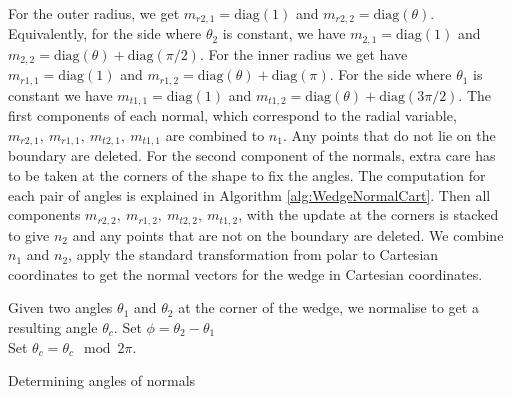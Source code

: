 For the outer radius, we get $m_{r2,1} = \text{diag}(1)$ and $m_{r2,2} = \text{diag} (\theta)$. Equivalently, for the side where $\theta_2$ is constant, we have $m_{2,1} = \text{diag}(1)$ and $m_{2,2} = \text{diag} (\theta) + \text{diag} (\pi/2)$. For the inner radius we get have $m_{r1,1} = \text{diag}(1)$ and $m_{r1,2} = \text{diag} (\theta) + \text{diag} (\pi)$. For the side where $\theta_1$ is constant we have $m_{t1,1} = \text{diag}(1)$ and $m_{t1,2} = \text{diag} (\theta) + \text{diag} (3\pi/2)$.
The first components of each normal, which correspond to the radial variable, $m_{r2,1}, \ m_{r1,1}, \ m_{t2,1}, \ m_{t1,1}$ are combined to $n_1$. Any points that do not lie on the boundary are deleted. 
For the second component of the normals, extra care has to be taken at the corners of the shape to fix the angles. The computation for each pair of angles is explained in Algorithm \ref{alg:WedgeNormalCart}.
Then all components $m_{r2,2}, \ m_{r1,2}, \ m_{t2,2}, \ m_{t1,2}$, with the update at the corners is stacked to give $n_2$ and any points that are not on the boundary are deleted.
We combine $n_1$ and $n_2$, apply the standard transformation from polar to Cartesian coordinates to get the normal vectors for the wedge in Cartesian coordinates.
\\
\begin{algorithm}[H]
	\SetAlgoLined
	Given two angles $\theta_1$ and $\theta_2$ at the corner of the wedge, we normalise to get a resulting angle $\theta_c$.
	Set $\phi = \theta_2 - \theta_1$\\
Set $ \theta_c = \theta_c \mod 2 \pi$.
	\caption{Determining angles of normals}
	\label{alg:WedgeNormalCart}
\end{algorithm}




